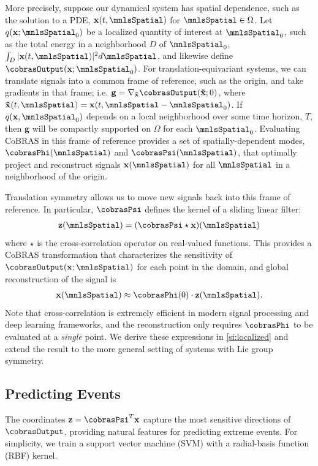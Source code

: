 \documentclass[twocolumn,10pt]{article}
\newcommand{\TheAppendix}{}
\newcommand{\CustomReference}[1]
    {#1\xspace}
\newcommand{\CustomSection}{S-}
\newcommand{\appendixLocal}
    {
        \CustomReference{%
            \TheAppendix \CustomSection2}%
    }
\begin{document}
More precisely, suppose our dynamical system has spatial dependence, such as the solution to a PDE, $\mathbf{x}(t, \mnlsSpatial)$ for $\mnlsSpatial \in \Omega$. 
%
Let $q(\mathbf x; \mnlsSpatial_0)$ be a localized quantity of interest at $\mnlsSpatial_0$, such as the total energy in a neighborhood $D$ of $\mnlsSpatial_0$, $\int_D |\mathbf{x}(t, \mnlsSpatial)|^2 d \mnlsSpatial$, and likewise define $\cobrasOutput(\mathbf{x}; \mnlsSpatial_0)$. 
%
For translation-equivariant systems, we can translate signals into a common frame of reference, such as the origin, and take gradients in that frame; i.e. $\mathbf g = \nabla_{\mathbf{\tilde x}} \cobrasOutput(\mathbf {\tilde x}; 0)$, where $\mathbf{\tilde x}(t, \mnlsSpatial) = \mathbf {x}(t, \mnlsSpatial - \mnlsSpatial_0)$. 
%
If $q(\mathbf{x}, \mnlsSpatial_0)$ depends on a local neighborhood
over some time horizon, $T$,
then $\mathbf g$ will be compactly supported on $\Omega$ for each $\mnlsSpatial_0$. Evaluating CoBRAS in this frame of reference provides a set of spatially-dependent modes,
$\cobrasPhi(\mnlsSpatial)$ and $\cobrasPsi(\mnlsSpatial)$, that optimally project and reconstruct signals $\mathbf{x}(\mnlsSpatial)$ for all $\mnlsSpatial$ in a neighborhood of the origin. 

Translation symmetry allows us to move new signals back into this frame of reference.
In particular, $\cobrasPsi$ defines the kernel of a sliding linear filter:
\begin{align}
    \label{eq:local_corr}
    \mathbf z(\mnlsSpatial) = (\cobrasPsi \star \mathbf x)(\mnlsSpatial)
\end{align}
where $\star$ is the cross-correlation operator on real-valued functions. This provides a CoBRAS transformation that characterizes the sensitivity of $\cobrasOutput(\mathbf x; \mnlsSpatial)$ for each point in the domain, and global reconstruction of the signal is
\begin{align}
    \label{eq:global_recon}
    \mathbf{x}(\mnlsSpatial) \approx \cobrasPhi(0) \cdot \mathbf z(\mnlsSpatial).
\end{align}
Note that cross-correlation is extremely efficient in modern signal processing and deep learning frameworks, and the reconstruction only requires $\cobrasPhi$ to be evaluated at a \textit{single} point. We derive these expressions in \ref{si:localized} 
and extend the result to the more general setting of systems with Lie group symmetry.

\subsection{Predicting Events}
\label{sec:methods_preds}
The coordinates $\mathbf z = \cobrasPsi^T \mathbf{x}$  capture the most sensitive directions of $\cobrasOutput$, providing natural features for predicting extreme events.  For simplicity, we train a support vector machine (SVM) with a radial-basis function (RBF) kernel. 
\end{document}
